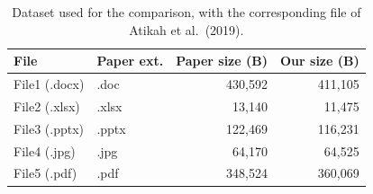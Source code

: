 \begin{table}[htbp]
\centering
\caption{Dataset used for the comparison, with the corresponding file of Atikah et al.\ (2019).}
\label{tab:p3_dataset}
\small
\begin{tabular}{llrr}
\toprule
\textbf{File} & \textbf{Paper ext.} & \textbf{Paper size (B)} & \textbf{Our size (B)} \\
\midrule
File1 (.docx) & .doc & 430,592 & 411,105 \\
File2 (.xlsx) & .xlsx & 13,140 & 11,475 \\
File3 (.pptx) & .pptx & 122,469 & 116,231 \\
File4 (.jpg) & .jpg & 64,170 & 64,525 \\
File5 (.pdf) & .pdf & 348,524 & 360,069 \\
\bottomrule
\end{tabular}
\end{table}
